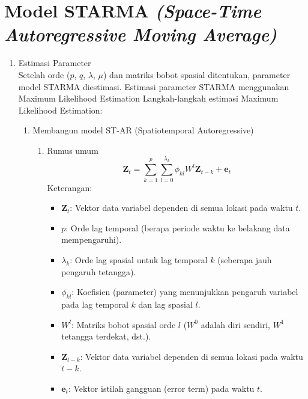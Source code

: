 \section{Model STARMA \textit{ (Space-Time Autoregressive Moving Average)}}
\begin{enumerate}
    \item Estimasi Parameter \\
    Setelah orde ($p$, $q$, $\lambda$, $\mu$) dan matriks bobot spasial ditentukan, parameter model STARMA diestimasi. Estimasi parameter STARMA menggunakan Maximum Likelihood Estimation
    Langkah-langkah estimasi Maximum Likelihood Estimation:
    \begin{enumerate}[label=\alph*)]
        \item Membangun model ST-AR (Spatiotemporal Autoregressive)
        \begin{enumerate}[label=\roman*)]
            \item Rumus umum
            \begin{equation}\label{st_ar}
                \mathbf{Z}_t = \sum_{k=1}^{p} \sum_{l=0}^{\lambda_k} \phi_{kl} W^{l} \mathbf{Z}_{t-k} + \mathbf{e}_t
            \end{equation}
            Keterangan:
            \begin{itemize}
                \item $\mathbf{Z}_t$: Vektor data variabel dependen di semua lokasi pada waktu $t$.
                \item $p$: Orde lag temporal (berapa periode waktu ke belakang data mempengaruhi).
                \item $\lambda_k$: Orde lag spasial untuk lag temporal $k$ (seberapa jauh pengaruh tetangga).
                \item $\phi_{kl}$: Koefisien (parameter) yang menunjukkan pengaruh variabel pada lag temporal $k$ dan lag spasial $l$.
                \item $W^{l}$: Matriks bobot spasial orde $l$ ($W^0$ adalah diri sendiri, $W^1$ tetangga terdekat, dst.).
                \item $\mathbf{Z}_{t-k}$: Vektor data variabel dependen di semua lokasi pada waktu $t-k$.
                \item $\mathbf{e}_t$: Vektor istilah gangguan (error term) pada waktu $t$.
            \end{itemize}


\end{enumerate}
\end{enumerate}
\end{enumerate}
